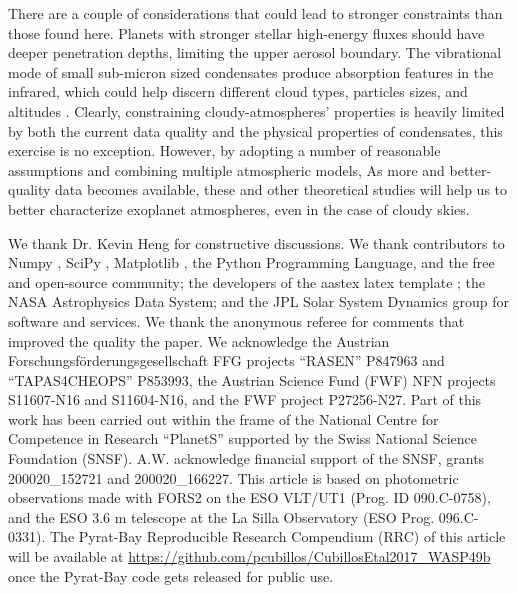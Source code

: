 \documentclass[tighten, times, twocolumn]{aastex61}  %
\begin{document}
There are a couple of considerations that could lead to stronger
constraints than those found here.  Planets with stronger stellar
high-energy fluxes should have deeper penetration depths, limiting the
upper aerosol boundary.  The vibrational mode of small sub-micron
sized condensates produce absorption features in the infrared, which
could help discern different cloud types, particles sizes, and
altitudes \citep{WakefordSing2015aaHotJupiterClouds}.
Clearly, constraining cloudy-atmospheres' properties is heavily
limited by both the current data quality and the physical properties
of condensates, this exercise is no exception.  However, by adopting a
number of reasonable assumptions and combining multiple atmospheric
models, 
As more and better-quality data becomes available, these and
other theoretical studies will help us to better characterize
exoplanet atmospheres, even in the case of cloudy skies.


\acknowledgments

We thank Dr. Kevin Heng for constructive discussions.  We thank
contributors to Numpy \citep{vanderWaltEtal2011numpy}, SciPy
\citep{JonesEtal2001scipy}, Matplotlib
\citep{Hunter2007ieeeMatplotlib}, the Python Programming Language, and
the free and open-source community; the
developers of the aastex latex template \citep{AASteam2016aastex61};
the NASA Astrophysics Data System;
and the JPL Solar System Dynamics group for software and services.  We
thank the anonymous referee for comments that improved the quality the
paper.  We acknowledge the Austrian
Forschungsf{\"o}rderungsgesellschaft FFG projects ``RASEN'' P847963
and ``TAPAS4CHEOPS'' P853993, the Austrian Science Fund (FWF) NFN
projects S11607-N16 and S11604-N16, and the FWF project P27256-N27.
Part of this work has been carried out within the frame of the
National Centre for Competence in Research ``PlanetS'' supported by
the Swiss National Science Foundation (SNSF). A.W. acknowledge
financial support of the SNSF, grants 200020\_152721 and
200020\_166227.  This article is based on photometric observations
made with FORS2 on the ESO VLT/UT1 (Prog. ID 090.C-0758), and the ESO
3.6 m telescope at the La Silla Observatory (ESO Prog. 096.C-0331).
The Pyrat-Bay Reproducible
Research Compendium (RRC) of this article will be available at
\href{https://github.com/pcubillos/CubillosEtal2017\_WASP49b}
{https://github.com/pcubillos/CubillosEtal2017\_WASP49b}
once the Pyrat-Bay code gets released for public use.
\end{document}
